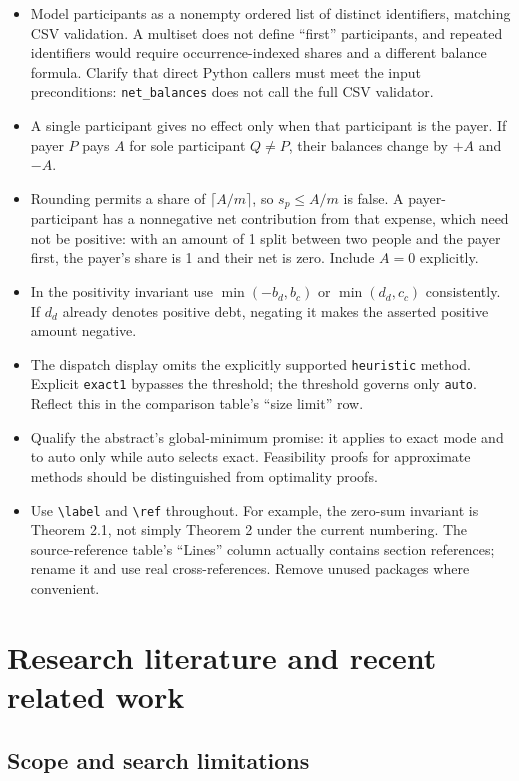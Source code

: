\documentclass[11pt]{article}
\begin{document}
\begin{itemize}
\item Model participants as a nonempty ordered list of distinct identifiers,
matching CSV validation. A multiset does not define ``first'' participants,
and repeated identifiers would require occurrence-indexed shares and a
different balance formula. Clarify that direct Python callers must meet
the input preconditions: \texttt{net\_balances} does not call the full
CSV validator.
\item A single participant gives no effect only when that participant is
the payer. If payer $P$ pays $A$ for sole participant $Q\ne P$, their
balances change by $+A$ and $-A$.
\item Rounding permits a share of $\lceil A/m\rceil$, so
$s_p\leq A/m$ is false. A payer-participant has a nonnegative net
contribution from that expense, which need not be positive: with an amount
of 1 split between two people and the payer first, the payer's share is
1 and their net is zero. Include $A=0$ explicitly.
\item In the positivity invariant use $\min(-b_d,b_c)$ or
$\min(d_d,c_c)$ consistently. If $d_d$ already denotes positive debt,
negating it makes the asserted positive amount negative.
\item The dispatch display omits the explicitly supported
\texttt{heuristic} method. Explicit \texttt{exact1} bypasses the threshold;
the threshold governs only \texttt{auto}. Reflect this in the comparison
table's ``size limit'' row.
\item Qualify the abstract's global-minimum promise: it applies to exact
mode and to auto only while auto selects exact. Feasibility proofs for
approximate methods should be distinguished from optimality proofs.
\item Use \verb|\label| and \verb|\ref| throughout. For example, the
zero-sum invariant is Theorem 2.1, not simply Theorem 2 under the current
numbering. The source-reference table's ``Lines'' column actually contains
section references; rename it and use real cross-references. Remove
unused packages where convenient.
\end{itemize}

\section{Research literature and recent related work}

\subsection{Scope and search limitations}
\end{document}
